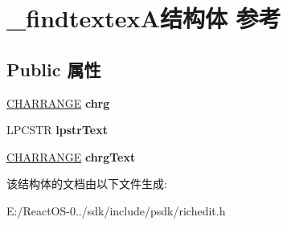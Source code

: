 \hypertarget{struct__findtextex_a}{}\section{\+\_\+findtextex\+A结构体 参考}
\label{struct__findtextex_a}
\subsection*{Public 属性}
\begin{DoxyCompactItemize}
\item 
\mbox{\label{struct__findtextex_a_a8afaa4744acb80a344838d2b81d58707}} 
\hyperlink{struct__charrange}{C\+H\+A\+R\+R\+A\+N\+GE} {\bfseries chrg}
\item 
\mbox{\label{struct__findtextex_a_a2bcc4e7c23ed5c0df4056ea54a0127f3}} 
L\+P\+C\+S\+TR {\bfseries lpstr\+Text}
\item 
\mbox{\label{struct__findtextex_a_addee76fe17f2f590f15ca1d56ed05684}} 
\hyperlink{struct__charrange}{C\+H\+A\+R\+R\+A\+N\+GE} {\bfseries chrg\+Text}
\end{DoxyCompactItemize}


该结构体的文档由以下文件生成\+:\begin{DoxyCompactItemize}
\item 
E\+:/\+React\+O\+S-\/0../sdk/include/psdk/richedit.\+h\end{DoxyCompactItemize}
